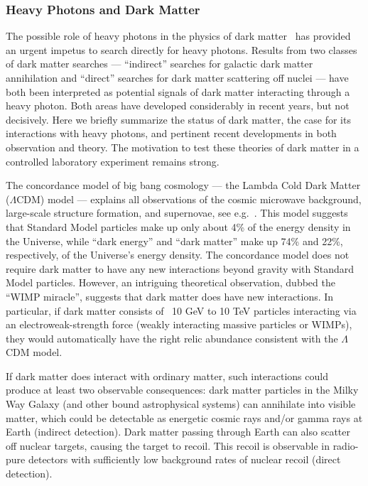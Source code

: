 \subsubsection{Heavy Photons and Dark Matter}
The possible role of heavy photons in the physics of dark matter~\cite{ArkaniHamed:2008qn,Pospelov:2008jd} has provided an urgent impetus to search directly for heavy photons.  Results from two classes of dark matter searches --- ``indirect'' searches for galactic dark matter annihilation and ``direct'' searches for dark matter scattering off nuclei --- have both been interpreted as potential signals of dark matter interacting through a heavy photon.  Both areas have developed considerably in recent years, but not decisively.  Here we briefly summarize the status of dark matter, the case for its interactions with heavy photons,  and pertinent recent developments in both observation and theory.  The motivation to test these theories of dark matter in a controlled laboratory experiment remains strong.    

The concordance model of big bang cosmology --- the Lambda Cold Dark Matter ($\Lambda$CDM) model --- explains all observations of the cosmic microwave background, large-scale structure formation, and supernovae, see 
e.g.~\cite{LambdaCDMData}. This model suggests that Standard Model particles make up only about 4\% of the energy density in the Universe, while ``dark energy'' and ``dark matter'' make up 74\% and 22\%, respectively, of the Universe's energy density. The concordance model does not require dark matter to have any new interactions beyond gravity with Standard Model particles. However, an intriguing theoretical observation, dubbed the ``WIMP miracle'', suggests that dark matter does have new interactions. In particular, if dark matter consists of ~10 GeV to 10 TeV particles interacting via an electroweak-strength force (weakly interacting massive particles or WIMPs), they would automatically have the right relic abundance consistent with the $\Lambda$CDM model.

If dark matter does interact with ordinary matter, such interactions could produce at least two observable consequences: dark matter particles in the Milky Way Galaxy (and other bound astrophysical systems) can annihilate into visible matter, which could be detectable as energetic cosmic rays and/or gamma rays at Earth (indirect detection).  Dark matter passing through Earth can also scatter off nuclear targets, causing the target to recoil.  This recoil is observable in radio-pure detectors with sufficiently low background rates of nuclear recoil (direct detection).  

